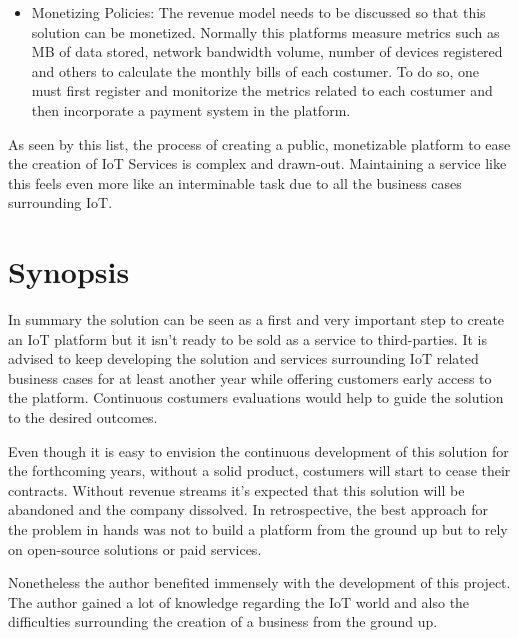 \begin{itemize}
    \item Monetizing Policies: The revenue model needs to be discussed so that this solution can be monetized. Normally this platforms measure metrics such as MB of data stored, network bandwidth volume, number of devices registered and others to calculate the monthly bills of each costumer. To do so, one must first register and monitorize the metrics related to each costumer and then incorporate a payment system in the platform.   
\end{itemize}

As seen by this list, the process of creating a public, monetizable platform to ease the creation of \gls{IoT} Services is complex and drawn-out. Maintaining a service like this feels even more like an interminable task due to all the business cases surrounding \gls{IoT}.

\section{Synopsis}
\label{sec:conclusion:synopsis}

In summary the solution can be seen as a first and very important step to create an \gls{IoT} platform but it isn't ready to be sold as a service to third-parties. It is advised to keep developing the solution and services surrounding \gls{IoT} related business cases for at least another year while offering customers early access to the platform. Continuous costumers evaluations would help to guide the solution to the desired outcomes.

Even though it is easy to envision the continuous development of this solution for the forthcoming years, without a solid product, costumers will start to cease their contracts. Without revenue streams it's expected that this solution will be abandoned and the company dissolved. In retrospective, the best approach for the problem in hands was not to build a platform from the ground up but to rely on open-source solutions or paid services.

Nonetheless the author benefited immensely with the development of this project. The author gained a lot of knowledge regarding the \gls{IoT} world and also the difficulties surrounding the creation of a business from the ground up.
